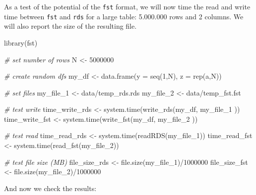 \documentclass[
  12pt,
]{book}
\newenvironment{Shaded}{\begin{snugshade}}{\end{snugshade}}
\newcommand{\AttributeTok}[1]{\textcolor[rgb]{0.61,0.61,0.61}{#1}}
\newcommand{\CommentTok}[1]{\textcolor[rgb]{0.37,0.37,0.37}{\textit{#1}}}
\newcommand{\DecValTok}[1]{\textcolor[rgb]{0.06,0.06,0.06}{#1}}
\newcommand{\FunctionTok}[1]{\textcolor[rgb]{0,0,0}{#1}}
\newcommand{\NormalTok}[1]{#1}
\newcommand{\OtherTok}[1]{\textcolor[rgb]{0.37,0.37,0.37}{#1}}
\newcommand{\SpecialCharTok}[1]{\textcolor[rgb]{0,0,0}{#1}}
\newcommand{\StringTok}[1]{\textcolor[rgb]{0.5,0.5,0.5}{#1}}
\begin{document}
As a test of the potential of the \texttt{fst} format, we will now time the read and write time between \texttt{fst} and \texttt{rds} for a large table: 5.000.000 rows and 2 columns. We will also report the size of the resulting file.

\begin{Shaded}
\begin{Highlighting}[]
\FunctionTok{library}\NormalTok{(fst)}

\CommentTok{\# set number of rows}
\NormalTok{N }\OtherTok{\textless{}{-}} \DecValTok{5000000}

\CommentTok{\# create random dfs}
\NormalTok{my\_df }\OtherTok{\textless{}{-}} \FunctionTok{data.frame}\NormalTok{(}\AttributeTok{y =} \FunctionTok{seq}\NormalTok{(}\DecValTok{1}\NormalTok{,N),}
                    \AttributeTok{z =} \FunctionTok{rep}\NormalTok{(}\StringTok{\textquotesingle{}a\textquotesingle{}}\NormalTok{,N))}

\CommentTok{\# set files}
\NormalTok{my\_file\_1 }\OtherTok{\textless{}{-}} \StringTok{\textquotesingle{}data/temp\_rds.rds\textquotesingle{}}
\NormalTok{my\_file\_2 }\OtherTok{\textless{}{-}} \StringTok{\textquotesingle{}data/temp\_fst.fst\textquotesingle{}}

\CommentTok{\# test write}
\NormalTok{time\_write\_rds }\OtherTok{\textless{}{-}} \FunctionTok{system.time}\NormalTok{(}\FunctionTok{write\_rds}\NormalTok{(my\_df, my\_file\_1 ))}
\NormalTok{time\_write\_fst }\OtherTok{\textless{}{-}} \FunctionTok{system.time}\NormalTok{(}\FunctionTok{write\_fst}\NormalTok{(my\_df, my\_file\_2 ))}

\CommentTok{\# test read}
\NormalTok{time\_read\_rds }\OtherTok{\textless{}{-}} \FunctionTok{system.time}\NormalTok{(}\FunctionTok{readRDS}\NormalTok{(my\_file\_1))}
\NormalTok{time\_read\_fst }\OtherTok{\textless{}{-}} \FunctionTok{system.time}\NormalTok{(}\FunctionTok{read\_fst}\NormalTok{(my\_file\_2))}

\CommentTok{\# test file size (MB)}
\NormalTok{file\_size\_rds }\OtherTok{\textless{}{-}} \FunctionTok{file.size}\NormalTok{(my\_file\_1)}\SpecialCharTok{/}\DecValTok{1000000}
\NormalTok{file\_size\_fst }\OtherTok{\textless{}{-}} \FunctionTok{file.size}\NormalTok{(my\_file\_2)}\SpecialCharTok{/}\DecValTok{1000000}
\end{Highlighting}
\end{Shaded}

And now we check the results:
\end{document}
